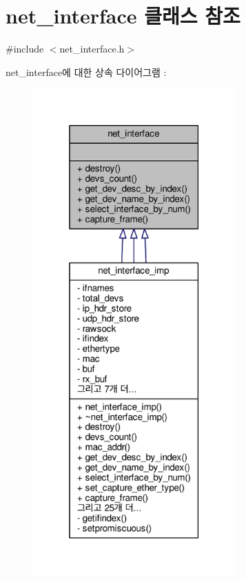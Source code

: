 \hypertarget{classavdecc__lib_1_1net__interface}{}\section{net\+\_\+interface 클래스 참조}
\label{classavdecc__lib_1_1net__interface}


{\ttfamily \#include $<$net\+\_\+interface.\+h$>$}



net\+\_\+interface에 대한 상속 다이어그램 \+: 
\nopagebreak
\begin{figure}[H]
\begin{center}
\leavevmode
\includegraphics[width=220pt]{classavdecc__lib_1_1net__interface__inherit__graph}
\end{center}
\end{figure}


